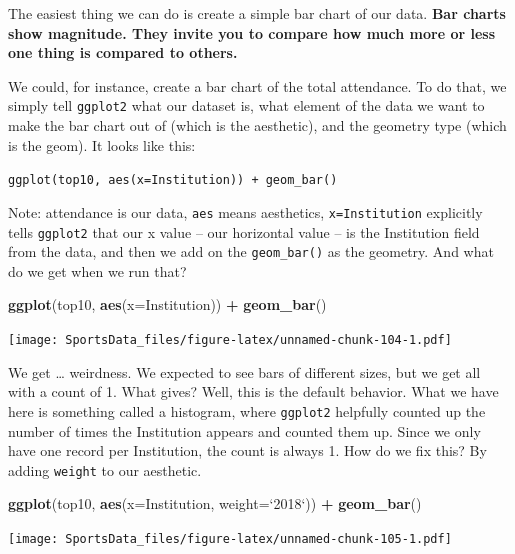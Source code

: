 \documentclass[]{book}
\newenvironment{Shaded}{\begin{snugshade}}{\end{snugshade}}
\newcommand{\DataTypeTok}[1]{\textcolor[rgb]{0.13,0.29,0.53}{#1}}
\newcommand{\KeywordTok}[1]{\textcolor[rgb]{0.13,0.29,0.53}{\textbf{#1}}}
\newcommand{\NormalTok}[1]{#1}
\newcommand{\OperatorTok}[1]{\textcolor[rgb]{0.81,0.36,0.00}{\textbf{#1}}}
\newcommand{\StringTok}[1]{\textcolor[rgb]{0.31,0.60,0.02}{#1}}
\begin{document}
The easiest thing we can do is create a simple bar chart of our data. \textbf{Bar charts show magnitude. They invite you to compare how much more or less one thing is compared to others.}

We could, for instance, create a bar chart of the total attendance. To do that, we simply tell \texttt{ggplot2} what our dataset is, what element of the data we want to make the bar chart out of (which is the aesthetic), and the geometry type (which is the geom). It looks like this:

\texttt{ggplot(top10,\ aes(x=Institution))\ +\ geom\_bar()}

Note: attendance is our data, \texttt{aes} means aesthetics, \texttt{x=Institution} explicitly tells \texttt{ggplot2} that our x value -- our horizontal value -- is the Institution field from the data, and then we add on the \texttt{geom\_bar()} as the geometry. And what do we get when we run that?

\begin{Shaded}
\begin{Highlighting}[]
\KeywordTok{ggplot}\NormalTok{(top10, }\KeywordTok{aes}\NormalTok{(}\DataTypeTok{x=}\NormalTok{Institution)) }\OperatorTok{+}\StringTok{ }\KeywordTok{geom_bar}\NormalTok{()}
\end{Highlighting}
\end{Shaded}

\texttt{[image: SportsData\_files/figure-latex/unnamed-chunk-104-1.pdf]}

We get \ldots{} weirdness. We expected to see bars of different sizes, but we get all with a count of 1. What gives? Well, this is the default behavior. What we have here is something called a histogram, where \texttt{ggplot2} helpfully counted up the number of times the Institution appears and counted them up. Since we only have one record per Institution, the count is always 1. How do we fix this? By adding \texttt{weight} to our aesthetic.

\begin{Shaded}
\begin{Highlighting}[]
\KeywordTok{ggplot}\NormalTok{(top10, }\KeywordTok{aes}\NormalTok{(}\DataTypeTok{x=}\NormalTok{Institution, }\DataTypeTok{weight=}\StringTok{`}\DataTypeTok{2018}\StringTok{`}\NormalTok{)) }\OperatorTok{+}\StringTok{ }
\StringTok{  }\KeywordTok{geom_bar}\NormalTok{()}
\end{Highlighting}
\end{Shaded}

\texttt{[image: SportsData\_files/figure-latex/unnamed-chunk-105-1.pdf]}
\end{document}
